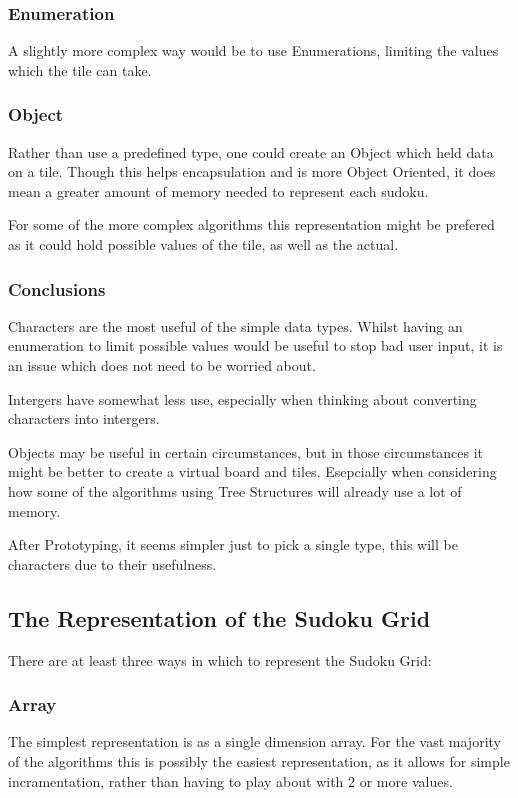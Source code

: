 \documentclass[10pt,letterpaper]{article}
\begin{document}
	\subsubsection{Enumeration}
	  A slightly more complex way would be to use Enumerations, limiting the values which the tile can take.
	
	\subsubsection{Object}
	  Rather than use a predefined type, one could create an Object which held data on a tile. Though this helps encapsulation and is more Object Oriented, it does mean a greater amount of memory needed to represent each sudoku.
	  
	  For some of the more complex algorithms this representation might be prefered as it could hold possible values of the tile, as well as the actual.
	
	\subsubsection{Conclusions}
	  Characters are the most useful of the simple data types. Whilst having an enumeration to limit possible values would be useful to stop bad user input, it is an issue which does not need to be worried about.
	  
	  Intergers have somewhat less use, especially when thinking about converting characters into intergers.
	  
	  Objects may be useful in certain circumstances, but in those circumstances it might be better to create a virtual board and tiles. Esepcially when considering how some of the algorithms using Tree Structures will already use a lot of memory.
	  
	  After Prototyping, it seems simpler just to pick a single type, this will be characters due to their usefulness.
	  
      \subsection{The Representation of the Sudoku Grid}
	There are at least three ways in which to represent the Sudoku Grid:
	\subsubsection{Array}
	  The simplest representation is as a single dimension array. For the vast majority of the algorithms this is possibly the easiest representation, as it allows for simple incramentation, rather than having to play about with 2 or more values.
	
\end{document}
